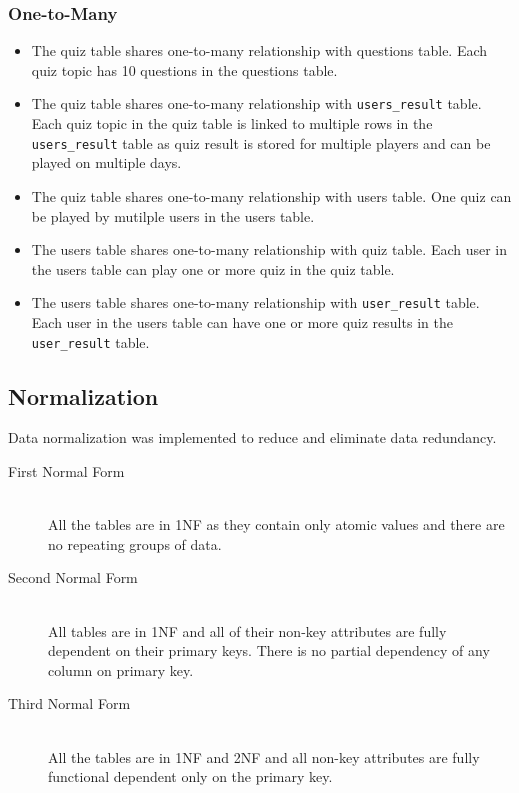 \subsubsection{One-to-Many}
\label{ssub:One-to-Many}

\begin{itemize}

	\item The quiz table shares one-to-many relationship with questions table.
		Each quiz topic has 10 questions in the questions table.

	\item The quiz table shares one-to-many relationship with
		\verb+users_result+ table. Each quiz topic in the quiz table is linked
		to multiple rows in the \verb+users_result+ table as quiz result is
		stored for multiple players and can be played on multiple days.

	\item The quiz table shares one-to-many relationship with users table. One
		quiz can be played by mutilple users in the users table.

	\item The users table shares one-to-many relationship with quiz table. Each
		user in the users table can play one or more quiz in the quiz table.

	\item The users table shares one-to-many relationship with
		\verb+user_result+ table. Each user in the users table can have one or
		more quiz results in the \verb+user_result+ table.

\end{itemize}

\subsection{Normalization}
\label{sub:normalization}

Data normalization was implemented to reduce and eliminate data redundancy.

\begin{description}

	\item[First Normal Form] \hfill \\ All the tables are in 1NF as they
		contain only atomic values and there are no repeating groups of data.

	\item[Second Normal Form] \hfill \\ All tables are in 1NF and all of their
		non-key attributes are fully dependent on their primary keys. There is
		no partial dependency of any column on primary key.

	\item[Third Normal Form] \hfill \\ All the tables are in 1NF and 2NF and
		all non-key attributes are fully functional dependent only on the
		primary key.

\end{description}
